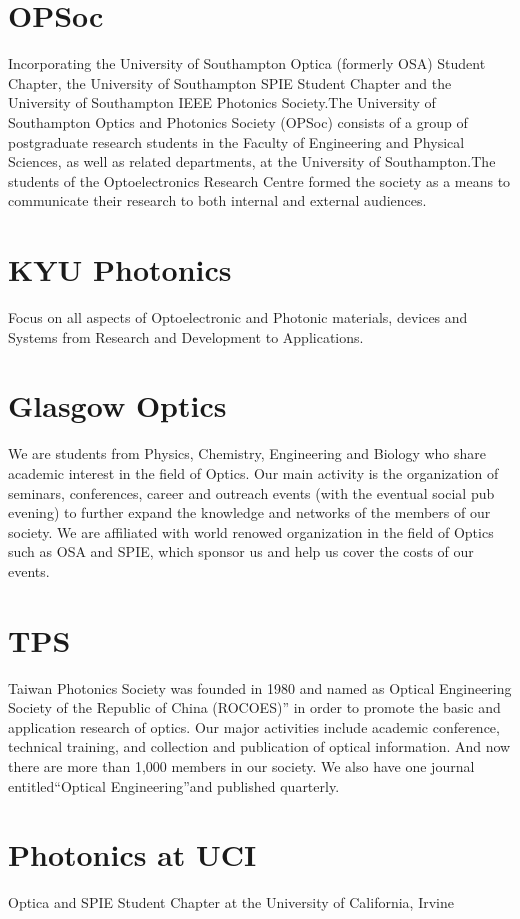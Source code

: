 \documentclass[10pt, a4paper, twocolumn]{article}
\begin{document}
    \section{OPSoc}
    Incorporating the University of Southampton Optica (formerly OSA) Student Chapter, the University of Southampton SPIE Student Chapter and the University of Southampton IEEE Photonics Society.The University of Southampton Optics and Photonics Society (OPSoc) consists of a group of postgraduate research students in the Faculty of Engineering and Physical Sciences, as well as related departments, at the University of Southampton.The students of the Optoelectronics Research Centre formed the society as a means to communicate their research to both internal and external audiences.

    \section{KYU Photonics}
    Focus on all aspects of Optoelectronic and Photonic materials, devices and Systems from Research and Development to Applications.

    \section{Glasgow Optics}
    We are students from Physics, Chemistry, Engineering and Biology who share academic interest in the field of Optics. Our main activity is the organization of seminars, conferences, career and outreach events (with the eventual social pub evening) to further expand the knowledge and networks of the members of our society. We are affiliated with world renowed organization in the field of Optics such as OSA and SPIE, which sponsor us and help us cover the costs of our events.

    \section{TPS}
    Taiwan Photonics Society was founded in 1980 and named as Optical Engineering Society of the Republic of China (ROCOES)” in order to promote the basic and application research of optics. Our major activities include academic conference, technical training, and collection and publication of optical information. And now there are more than 1,000 members in our society. We also have one journal entitled“Optical Engineering”and published quarterly.

    \section{Photonics at UCI}
    Optica and SPIE Student Chapter at the University of California, Irvine
\end{document}
